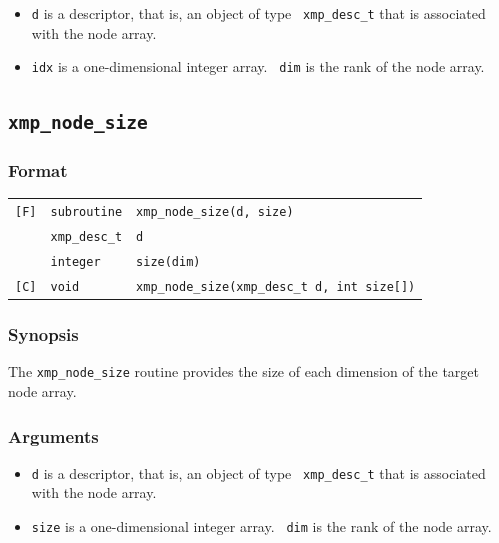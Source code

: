 \begin{itemize}
 \item {\tt d} is a descriptor, that is, an object of type {\tt
       xmp\_desc\_t} that is associated with the node array.
 \item {\tt idx} is a one-dimensional integer array. {\tt
       dim} is the rank of the node array.
\end{itemize}


\subsection{\tt xmp\_node\_size}

\subsubsection*{Format}

\begin{tabular}{lll}

\verb![F]!& {\tt subroutine}& {\tt xmp\_node\_size(d, size)}\\
          & {\tt xmp\_desc\_t} & {\tt d}\\
          & {\tt integer} & {\tt size(dim)}\\

\verb![C]!&  {\tt void}& {\tt xmp\_node\_size(xmp\_desc\_t d, int size[])}\\

\end{tabular}

\subsubsection*{Synopsis}

The {\tt xmp\_node\_size} routine provides the size of each dimension of
the target node array.

\subsubsection*{Arguments}

\begin{itemize}
 \item {\tt d} is a descriptor, that is, an object of type {\tt
       xmp\_desc\_t} that is associated with the node array.
 \item {\tt size} is a one-dimensional integer array. {\tt
       dim} is the rank of the node array.
\end{itemize}


